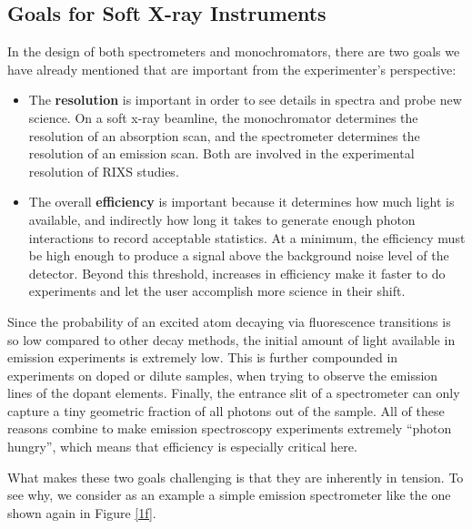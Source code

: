 \subsection{Goals for Soft X-ray Instruments}
\label{resolutionGoals}
In the design of both spectrometers and monochromators, there are two goals we have already mentioned that are important from the experimenter's perspective:
\begin{itemize}
\item The \textbf{resolution} is important in order to see details in spectra and probe new science.  On a soft x-ray beamline, the monochromator determines the resolution of an absorption scan, and the spectrometer determines the resolution of an emission scan.  Both are involved in the experimental resolution of RIXS studies.
\item The overall \textbf{efficiency} is important because it determines how much light is available, and indirectly how long it takes to generate enough photon interactions to record acceptable statistics.  At a minimum, the efficiency must be high enough to produce a signal above the background noise level of the detector.  Beyond this threshold, increases in efficiency make it faster to do experiments and let the user accomplish more science in their shift.
\end{itemize}

Since the probability of an excited atom decaying via fluorescence transitions is so low compared to other decay methods, the initial amount of light available in emission experiments is extremely low.  This is further compounded in experiments on doped or dilute samples, when trying to observe the emission lines of the dopant elements.  Finally, the entrance slit of a spectrometer can only capture a tiny geometric fraction of all photons out of the sample.  All of these reasons combine to make emission spectroscopy experiments extremely ``photon hungry'', which means that efficiency is especially critical here.

What makes these two goals challenging is that they are inherently in tension.  To see why, we consider as an example a simple emission spectrometer like the one shown again in Figure \ref{1f}.

